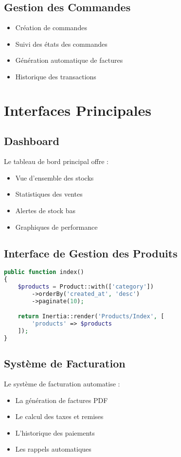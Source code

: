 \documentclass{report}
\begin{document}
\subsection{Gestion des Commandes}
\begin{itemize}
    \item Création de commandes
    \item Suivi des états des commandes
    \item Génération automatique de factures
    \item Historique des transactions
\end{itemize}

\section{Interfaces Principales}

\subsection{Dashboard}
Le tableau de bord principal offre :
\begin{itemize}
    \item Vue d'ensemble des stocks
    \item Statistiques des ventes
    \item Alertes de stock bas
    \item Graphiques de performance
\end{itemize}

\subsection{Interface de Gestion des Produits}
\begin{lstlisting}[language=php]
public function index()
{
    $products = Product::with(['category'])
        ->orderBy('created_at', 'desc')
        ->paginate(10);

    return Inertia::render('Products/Index', [
        'products' => $products
    ]);
}
\end{lstlisting}

\subsection{Système de Facturation}
Le système de facturation automatise :
\begin{itemize}
    \item La génération de factures PDF
    \item Le calcul des taxes et remises
    \item L'historique des paiements
    \item Les rappels automatiques
\end{itemize}
\end{document}
